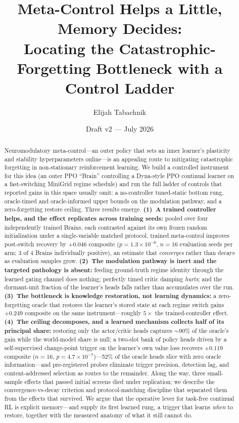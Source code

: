 \documentclass[11pt]{article}
\title{Meta-Control Helps a Little, Memory Decides:\\
Locating the Catastrophic-Forgetting Bottleneck with a Control Ladder}
\author{Elijah Tabachnik\\
\todo{affiliation / email}}
\date{Draft v2 --- July 2026}
\begin{document}
\maketitle

\begin{abstract}
Neuromodulatory meta-control---an outer policy that sets an inner learner's
plasticity and stability hyperparameters online---is an appealing route to
mitigating catastrophic forgetting in non-stationary reinforcement learning.
We build a controlled instrument for this idea (an outer PPO ``Brain''
controlling a Dyna-style PPO continual learner on a fast-switching MiniGrid
regime schedule) and run the full ladder of controls that reported gains in
this space usually omit: a no-controller tuned-static bottom rung, oracle-timed
and oracle-informed upper bounds on the modulation pathway, and a
zero-forgetting restore ceiling. Three results emerge. \textbf{(1)~A trained
controller helps, and the effect replicates across training seeds:} pooled over
four independently trained Brains, each contrasted against its own frozen
random initialization under a single-variable matched protocol, trained
meta-control improves post-switch recovery by $+0.046$ composite
($p=1.3\times10^{-6}$, $n{=}16$ evaluation seeds per arm; 3 of 4 Brains
individually positive), an estimate that \emph{converges} rather than decays as
evaluation samples grow. \textbf{(2)~The modulation pathway is inert and the
targeted pathology is absent:} feeding ground-truth regime identity through the
learned gating channel does nothing; perfectly timed critic damping
\emph{hurts}; and the dormant-unit fraction of the learner's heads falls
rather than accumulates over the run. \textbf{(3)~The bottleneck is knowledge restoration, not learning
dynamics:} a zero-forgetting oracle that restores the learner's stored state at
each regime switch gains $+0.249$ composite on the same instrument---roughly
$5\times$ the trained-controller effect. \textbf{(4)~The ceiling decomposes,
and a learned mechanism collects half of its principal share:} restoring only
the actor/critic heads captures $\sim$90\% of the oracle's gain while the
world-model share is null; a two-slot bank of policy heads driven by a
self-supervised change-point trigger on the learner's own value loss recovers
$+0.119$ composite ($n{=}16$, $p=4.7\times10^{-7}$)---52\% of the oracle heads
slice with zero oracle information---and pre-registered probes eliminate
trigger precision, detection lag, and content-addressed selection as routes to
the remainder. Along the way, three small-sample effects that passed initial
screens died under replication; we describe the convergence-vs-decay criterion
and protocol-matching discipline that separated them from the effects that
survived. We argue that the operative lever for task-free continual RL is
explicit memory---and supply its first learned rung, a trigger that learns
\emph{when} to restore, together with the measured anatomy of what it still
cannot do.
\end{abstract}
\end{document}
